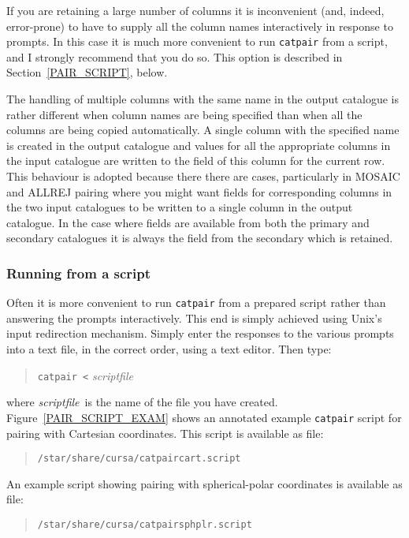 \documentclass[twoside,11pt]{article}
\renewcommand{\_}{\texttt{\symbol{95}}}
\begin{document}
If you are retaining a large number of columns it is inconvenient (and,
indeed, error-prone) to have to supply all the column names interactively
in response to prompts. In this case it is much more  convenient to run
{\tt catpair} from a script, and I strongly recommend that you do so. This
option is described in Section~\ref{PAIR_SCRIPT}, below.

The handling of multiple columns with the same name in the output catalogue
is rather different when column names are being specified than when all the
columns are being copied automatically. A single column with the specified
name is created in the output catalogue and values for all the appropriate
columns in the input catalogue are written to the field of this column
for the current row. This behaviour is adopted because there there are
cases, particularly in MOSAIC and ALLREJ pairing where you might want
fields for corresponding columns in the two input catalogues to be
written to a single column in the output catalogue. In the case where
fields are available from both the primary and secondary catalogues it is
always the field from the secondary which is retained.

\subsubsection{\label{PAIR_SCRIPT}Running from a script}

Often it is more convenient to run {\tt catpair} from a prepared script
rather than answering the prompts interactively. This end is simply
achieved using Unix's input redirection mechanism. Simply enter the
responses to the various prompts into a text file, in the correct order,
using a text editor. Then type:

\begin{verse}
{\tt catpair  <} {\it script\_file}
\end{verse}

where {\it script\_file}\, is the name of the file you have created.
Figure~\ref{PAIR_SCRIPT_EXAM} shows an annotated example {\tt catpair}
script for pairing with Cartesian coordinates.  This script is available
as file:

\begin{verse}
{\tt /star/share/cursa/catpair\_cart.script}
\end{verse}

An example script showing pairing with spherical-polar coordinates is
available as file:

\begin{verse}
{\tt /star/share/cursa/catpair\_sphplr.script}
\end{verse}
\end{document}
